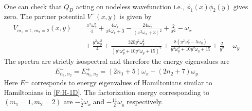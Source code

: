 \documentclass[12pt]{article}
\numberwithin{equation}{section} %
\begin{document}
{\begin{align*}
\end{align*}
One can check that $Q_D$ acting on nodeless wavefunction i.e., $\phi_1(x)\phi_2(y)$ gives zero. The partner potential $V^-(x,y)$ is given by 
\begin{align*}
  V^-_{m_1=1,m_2=2}(x,y)&=\frac{x^2 \omega_x^2}{4}+\frac{4 \omega_x}{x^2 \omega_x+3}-\frac{24 \omega_x}{\left(x^2 \omega_x+3\right)^2}+\frac{2}{x^2}-\omega_x\\&\quad+\frac{y^2 \omega_y^2}{4}+\frac{320 y^2 \omega_y^2}{\left(y^4 \omega_y^2+10 y^2 \omega_y+15\right)^2}+\frac{8 \left(y^2 \omega_y^2-5 \omega_y\right)}{y^4 \omega_y^2+10 y^2 \omega_y+15}+\frac{2}{y^2}-\omega_y
\end{align*}
The spectra are strictly isospectral and therefore the energy eigenvalues are
\begin{align*}
  E^-_{n_1,n_2}=E^+_{n_1,n_2}=(2 n_1+5)\omega_x+(2 n_2+7)\omega_y 
\end{align*}
Here $E^\pm$ corresponds to energy eigenvalues of Hamiltonians similar to Hamiltonians in \ref{F:H-1D}. The factorization energy corresponding to $(m_1=1,m_2=2)$ are $-\frac{7}{2}\omega_x$ and $-\frac{11}{2}\omega_y$ respectively.
}









\end{document}
